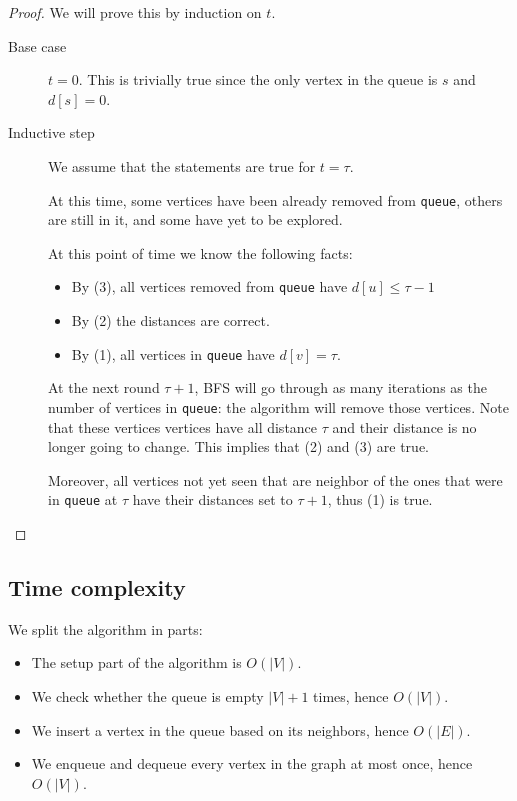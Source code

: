 \documentclass[12pt]{extarticle}
\begin{document}
\begin{proof}
    We will prove this by induction on $t$.

    \begin{description}
        \item[Base case] $t = 0$.
            This is trivially true since the only vertex in the queue is $s$ and $d[s] = 0$.

        \item[Inductive step] We assume that the statements are true for $t = \tau$.

            At this time, some vertices have been already removed from \texttt{queue}, others are still in it, and some have yet to be explored.

            At this point of time we know the following facts:
            \begin{itemize}
                \item By (3), all vertices removed from \texttt{queue} have $d[u] \leq \tau - 1$
                \item By (2) the distances are correct.
                \item By (1), all vertices in \texttt{queue} have $d[v] = \tau$.
            \end{itemize}

            At the next round $\tau + 1$, BFS will go through as many iterations as the number of vertices in \texttt{queue}: the algorithm will remove those vertices.
            Note that these vertices vertices have all distance $\tau$ and their distance is no longer going to change. This implies that (2) and (3) are true.

            Moreover, all vertices not yet seen that are neighbor of the ones that were in \texttt{queue} at $\tau$ have their distances set to $\tau + 1$, thus (1) is true.
    \end{description}
\end{proof}

\subsection{Time complexity}

We split the algorithm in parts:

\begin{itemize}
    \item The setup part of the algorithm is $O(|V|)$.
    \item We check whether the queue is empty $|V| + 1$ times, hence $O(|V|)$.
    \item We insert a vertex in the queue based on its neighbors, hence $O(|E|)$.
    \item We enqueue and dequeue every vertex in the graph at most once, hence $O(|V|)$.
\end{itemize}
\end{document}
